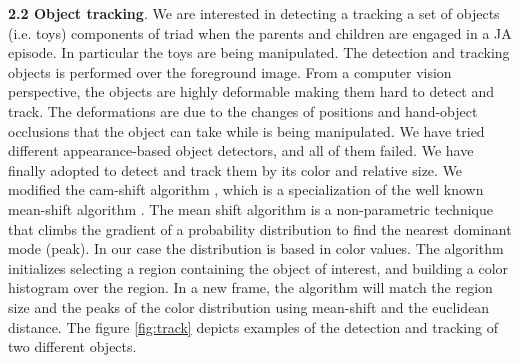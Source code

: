 \documentclass[10pt,letterpaper]{article}
\begin{document}
{\bf 2.2 Object tracking}. We are interested in detecting a tracking a set of objects (i.e. toys) components of triad when the parents and children are engaged in a JA episode. In particular the toys are being manipulated. The detection and tracking objects is performed over the foreground image. From a computer vision perspective, the objects are highly deformable making them hard to detect and track. The deformations are due to the changes of positions and hand-object occlusions that the object can take while is being manipulated. We have tried different appearance-based \cite{TLD} object detectors, and all of them failed. We have finally adopted to detect and track them by its color and relative size. We modified the cam-shift algorithm \cite{bradsky}, which is a specialization of  the well known mean-shift algorithm \cite{Meer2002}. The mean shift algorithm is a non-parametric technique that climbs the gradient of a probability distribution to find the nearest dominant mode (peak). In our case the distribution is based in color values. The algorithm initializes selecting a region containing the object of interest, and building a color histogram over the region. In a new frame, the algorithm will match the region size and the peaks of the color distribution using mean-shift and the euclidean distance. The figure \ref{fig:track} depicts examples of the detection and tracking of two different objects.\\
\end{document}
